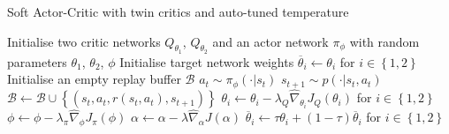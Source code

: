 {\begin{algorithm}
\caption{Soft Actor-Critic with twin critics \cite{ref:td3} and auto-tuned temperature \cite{ref:sac-auto}}
\label{alg:sac}
\begin{algorithmic}
\State Initialise two critic networks $Q_{\theta_1}$, $Q_{\theta_2}$ and an actor network $\pi_\phi$ with random parameters $\theta_1$, $\theta_2$, $\phi$
\State Initialise target network weights $\overline{\theta}_i \gets \theta_i$  for $i \in \left\{1,2\right\}$
\State Initialise an empty replay buffer $\mathcal{B}$
        \State $a_t \sim \pi_\phi(\cdot|s_t)$
        \State $s_{t+1} \sim p(\cdot|s_t,a_t)$
        \State $\mathcal{B} \gets \mathcal{B} \cup \left\{(s_t,a_t,r(s_t,a_t),s_{t+1})\right\}$
    \EndFor
        \State $\theta_i \gets \theta_i - \lambda_Q\hat\nabla_{\theta_i}J_Q(\theta_i)$ for $i \in \left\{1,2\right\}$
        \State $\phi \gets \phi - \lambda_\pi\hat\nabla_{\phi}J_\pi(\phi)$
        \State $\alpha \gets \alpha - \lambda\hat\nabla_{\alpha}J(\alpha)$
        \State $\overline{\theta}_i \gets \tau\theta_i + (1-\tau)\overline{\theta}_i$ for $i \in \left\{1,2\right\}$
    \EndFor
\EndFor
\end{algorithmic}
\end{algorithm}
}
\newpage
